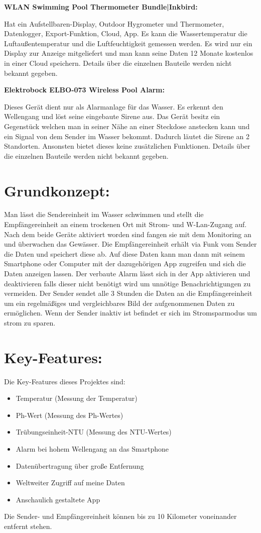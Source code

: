 \textbf{WLAN Swimming Pool Thermometer Bundle|Inkbird:}


Hat ein Aufstellbaren-Display, Outdoor Hygrometer und Thermometer, 
Datenlogger, Export-Funktion, Cloud, App. 
Es kann die Wassertemperatur die Luftaußentemperatur und die Luftfeuchtigkeit gemessen werden.
Es wird nur ein Display zur Anzeige mitgeliefert und man 
kann seine Daten 12 Monate kostenlos in einer Cloud speichern.
Details über die einzelnen Bauteile werden nicht bekannt gegeben.

\textbf{Elektrobock ELBO-073 Wireless Pool Alarm:}


Dieses Gerät dient nur als Alarmanlage für das Wasser. 
Es erkennt den Wellengang und löst seine eingebaute Sirene aus. 
Das Gerät besitz ein Gegenstück welchen man in seiner Nähe an einer Steckdose anstecken 
kann und ein Signal von dem Sender im Wasser bekommt. 
Dadurch läutet die Sirene an 2 Standorten. Ansonsten bietet dieses keine zusätzlichen Funktionen.
Details über die einzelnen Bauteile werden nicht bekannt gegeben.
\newpage
\section{Grundkonzept:}
Man lässt die Sendereinheit im Wasser schwimmen und stellt die Empfängereinheit an einem trockenen Ort mit Strom- und W-Lan-Zugang auf. 
Nach dem beide Geräte aktiviert worden sind fangen sie mit dem Monitoring an und überwachen das Gewässer. 
Die Empfängereinheit erhält via Funk vom Sender die Daten und speichert diese ab. Auf diese Daten kann man dann mit seinem Smartphone oder Computer mit der dazugehörigen App zugreifen und sich die Daten anzeigen lassen. 
Der verbaute Alarm lässt sich in der App aktivieren und deaktivieren falls dieser nicht benötigt wird um 
unnötige Benachrichtigungen zu vermeiden.
Der Sender sendet alle 3 Stunden die Daten an die Empfängereinheit um ein regelmäßiges und vergleichbares Bild der aufgenommenen Daten zu ermöglichen.
Wenn der Sender inaktiv ist befindet er sich im Stromsparmodus um strom zu sparen.

\section{Key-Features:}
Die Key-Features dieses Projektes sind:
\begin{itemize}
    \item Temperatur (Messung der Temperatur)
    \item Ph-Wert (Messung des Ph-Wertes)
    \item Trübungseinheit-NTU (Messung des NTU-Wertes) 
    \item Alarm bei hohem Wellengang an das Smartphone
    \item Datenübertragung über große Entfernung
    \item Weltweiter Zugriff auf meine Daten 
    \item Anschaulich gestaltete App
\end{itemize}
Die Sender- und Empfängereinheit können bis zu 10 Kilometer voneinander entfernt stehen. 

